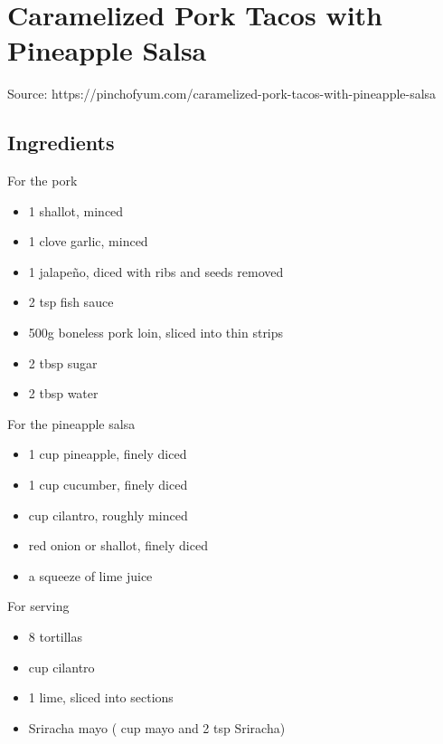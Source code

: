 \clearpage
\section{Caramelized Pork Tacos with Pineapple Salsa}


Source: https://pinchofyum.com/caramelized-pork-tacos-with-pineapple-salsa

\subsection{Ingredients}

\begin{multicols}{2}
    For the pork

    \begin{itemize}
        \item 1 shallot, minced
        \item 1 clove garlic, minced
        \item 1 jalapeño, diced with ribs and seeds removed
        \item 2 tsp fish sauce
        \item 500g boneless pork loin, sliced into thin strips
        \item 2 tbsp sugar
        \item 2 tbsp water
    \end{itemize}

    \vfill\null
    \columnbreak

    For the pineapple salsa

    \begin{itemize}
        \item 1 cup pineapple, finely diced
        \item 1 cup cucumber, finely diced
        \item {} cup cilantro, roughly minced
        \item {} red onion or shallot, finely diced
        \item a squeeze of lime juice
    \end{itemize}

    For serving

    \begin{itemize}
        \item 8 tortillas
        \item {} cup cilantro
        \item 1 lime, sliced into sections
        \item Sriracha mayo ( cup mayo and 2 tsp Sriracha)
    \end{itemize}
\end{multicols}


